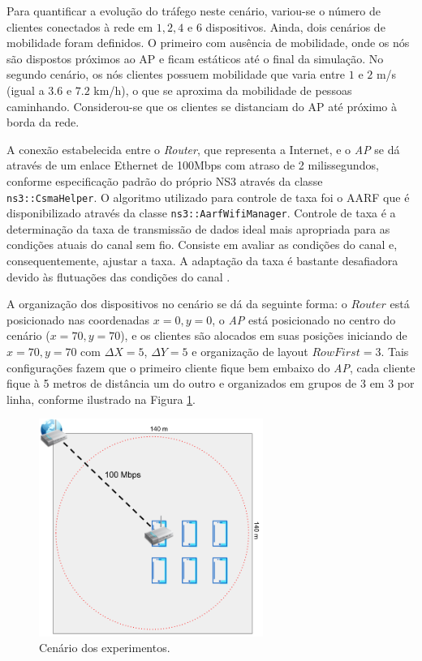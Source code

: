 \documentclass[12pt]{article}
\begin{document}
Para quantificar a evolução do tráfego neste cenário, variou-se o número de clientes conectados à rede em $1, 2, 4$ e $6$ dispositivos. Ainda, dois cenários de mobilidade foram definidos. O primeiro com ausência de mobilidade, onde os nós são dispostos próximos ao AP e ficam estáticos até o final da simulação. No segundo cenário, os nós clientes possuem mobilidade que varia entre $1$ e $2$ m/s (igual a $3.6$ e $7.2$ km/h), o que se aproxima da mobilidade de pessoas caminhando. Considerou-se que os clientes se distanciam do AP até próximo à borda da rede.

A conexão estabelecida entre o \textit{Router}, que representa a Internet, e o \textit{AP} se dá através de um enlace Ethernet de 100Mbps com atraso de 2 milissegundos, conforme especificação padrão do próprio NS3 através da classe \texttt{ns3::CsmaHelper}. O algoritmo utilizado para controle de taxa foi o AARF que é disponibilizado através da classe \texttt{ns3::AarfWifiManager}. Controle de taxa é a determinação da taxa de transmissão de dados ideal mais apropriada para as condições atuais do canal sem fio. Consiste em avaliar as condições do canal e, consequentemente, ajustar a taxa. A adaptação da taxa é bastante desafiadora devido às flutuações das condições do canal \cite{lacage2004ieee, wong2006robust}.

A organização dos dispositivos no cenário se dá da seguinte forma: o $Router$ está posicionado nas coordenadas $x=0,y=0$, o \textit{AP} está posicionado no centro do cenário ($x = 70, y = 70$), e os clientes são alocados em suas posições iniciando de $x=70,y=70$ com $\Delta X = 5$, $\Delta Y = 5$ e organização de layout $RowFirst = 3$. Tais configurações fazem que o primeiro cliente fique bem embaixo do \textit{AP}, cada cliente fique à 5 metros de distância um do outro e organizados em grupos de 3 em 3 por linha, conforme ilustrado na Figura \ref{fig:cenario}.

\begin{figure}[ht]
	\centering
	\includegraphics[width=0.65\textwidth]{img/cenario_mo655.png}
	\caption{Cenário dos experimentos.}
	\label{fig:cenario}
\end{figure}
\end{document}
